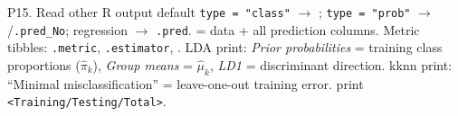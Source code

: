 \begin{topic}{P15. Read other R output }
 default \texttt{type = "class"} $\to$ ; \texttt{type = "prob"} $\to$
/\texttt{.pred\_No}; regression $\to$ \texttt{.pred}.  = data + all prediction columns.
Metric tibbles: \texttt{.metric}, \texttt{.estimator}, . LDA print: \emph{Prior probabilities} = training
class proportions ($\hat\pi_k$), \emph{Group means} = $\hat\mu_k$, \emph{LD1} = discriminant direction. kknn print:
``Minimal misclassification'' = leave-one-out training error.  print
\texttt{<Training/Testing/Total>}.
\end{topic}

